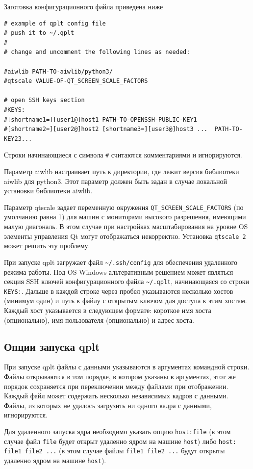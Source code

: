 \documentclass[12pt]{article}
\begin{document}
Заготовка конфигурационного файла приведена ниже
\begin{verbatim}
# example of qplt config file
# push it to ~/.qplt
#
# change and uncomment the following lines as needed:

#aiwlib PATH-TO-aiwlib/python3/
#qtscale VALUE-OF-QT_SCREEN_SCALE_FACTORS

# open SSH keys section
#KEYS:
#[shortname1=][user1@]host1 PATH-TO-OPENSSH-PUBLIC-KEY1
#[shortname2=][user2@]host2 [shortname3=][user3@]host3 ...  PATH-TO-KEY23...
\end{verbatim}

Строки начинающиеся с символа \verb'#' считаются комментариями и игнорируются. 

Параметр aiwlib настраивает путь к директории, где лежит версия библиотеки aiwlib для python3. Этот параметр должен быть задан в случае
локальной установки библиотеки aiwlib.

Параметр qtscale задает переменную окружения \verb'QT_SCREEN_SCALE_FACTORS' (по умолчанию равна 1) для
машин с мониторами высокого разрешения, имеющими малую диагональ. В этом случае при настройках масштабирования на уровне OS элементы управления Qt могут отображаться некорректно. Установка \verb'qtscale 2' может решить эту проблему. 

При запуске qplt загружает файл \verb'~/.ssh/config' для обеспечения удаленного режима работы.
Под OS Windows альтеративным решением может являться секция SSH ключей конфигурационного файла \verb'~/.qplt',
начинающаяся со строки \verb'KEYS:'.
Дальше в каждой строке через пробел указываются несколько хостов (минимум один) и путь к файлу с открытым ключом для доступа к этим хостам.
Каждый хост указывается в следующем формате: короткое имя хоста (опционально), имя пользователя (опционально) и адрес хоста.

\subsection{Опции запуска qplt}

При запуске qplt файлы с данными указываются в аргументах командной строки.
Файлы открываются в том порядке, в котором указаны в аргументах, этот же порядок сохраняется при переключении между файлами при отображении.
Каждый файл может содержать несколько независимых кадров с данными. Файлы, из которых не удалось загрузить ни одного кадра с данными, игнорируются.

Для удаленного запуска ядра необходимо указать опцию \verb'host:file' (в этом случае файл \verb'file'
будет открыт удаленно ядром на машине \verb'host') либо \verb'host: file1 file2 ...' (в этом случае файлы \verb'file1 file2 ...'
будут открыты удаленно ядром на машине \verb'host'). 
\end{document}
